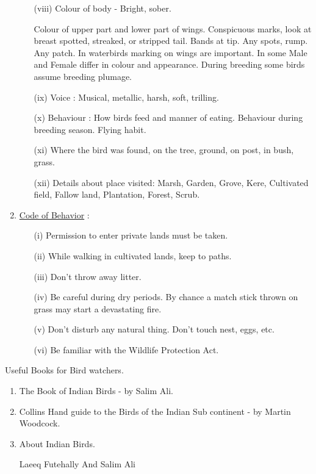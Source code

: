 \begin{enumerate}
\begin{itemize}
\item[(viii)] Colour of body - Bright, sober. 

Colour of upper part and lower part of wings. Conspicuous 
marks, look at breast spotted, streaked, or stripped 
tail. Bands at tip. Any spots, rump. Any patch. 
In waterbirds marking on wings are important. In some 
Male and Female differ in colour and appearance. During\break 
breeding some birds assume breeding plumage. 

\item[(ix)] Voice : Musical, metallic, harsh, soft, trilling. 

\item[(x)] Behaviour : How birds feed and manner of eating. Behaviour 
during breeding season. Flying habit. 

\item[(xi)] Where the bird was found, on the tree, ground, on post, in 
bush, grass. 

\item[(xii)] Details about place visited: Marsh, Garden, Grove, 
Kere, Cultivated field, Fallow land, Plantation, Forest, 
Scrub. 
\end{itemize}

\item \underline{Code of Behavior} : 
\begin{itemize}
\item[(i)] Permission to enter private lands must be taken. 

\item[(ii)] While walking in cultivated lands, keep to paths. 

\item[(iii)] Don't throw away litter. 

\item[(iv)] Be careful during dry periods. By chance a match stick 
thrown on grass may start a devastating fire. 

\item[(v)] Don't disturb any natural thing. Don't touch nest, eggs, 
etc.

\item[(vi)] Be familiar with the Wildlife Protection Act. 
\end{itemize}
\end{enumerate}
\newpage

Useful Books for Bird watchers. 
\begin{enumerate}
\item The Book of Indian Birds - by Salim Ali. 

\item Collins Hand guide to the Birds of the Indian Sub continent - by Martin Woodcock. 

\item About Indian Birds. 

Laeeq Futehally And Salim Ali 
\end{enumerate}

